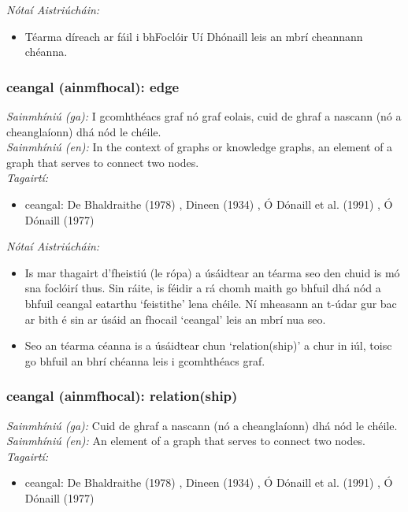  \noindent \textit{Nótaí Aistriúcháin:}
\begin{itemize}
	\item Téarma díreach ar fáil i bhFoclóir Uí Dhónaill leis an mbrí cheannann chéanna.
\end{itemize}


\subsubsection*{ceangal (ainmfhocal): edge}
 \noindent \textit{Sainmhíniú (ga):} I gcomhthéacs graf nó graf eolais, cuid de ghraf a nascann (nó a cheanglaíonn) dhá nód le chéile.
\\
 \noindent \textit{Sainmhíniú (en):} In the context of graphs or knowledge graphs, an element of a graph that serves to connect two nodes.
\\
 \noindent \textit{Tagairtí:}
\begin{itemize}
	\item ceangal: De Bhaldraithe (1978) \cite{de-bhaldraithe}, Dineen (1934) \cite{dineen}, Ó Dónaill et al. (1991) \cite{focloir-beag}, Ó Dónaill (1977) \cite{odonaill}
\end{itemize}

 \noindent \textit{Nótaí Aistriúcháin:}
\begin{itemize}
	\item Is mar thagairt d'fheistiú (le rópa) a úsáidtear an téarma seo den chuid is mó sna foclóirí thus. Sin ráite, is féidir a rá chomh maith go bhfuil dhá nód a bhfuil ceangal eatarthu `feistithe' lena chéile. Ní mheasann an t-údar gur bac ar bith é sin ar úsáid an fhocail `ceangal' leis an mbrí nua seo.
	\item Seo an téarma céanna is a úsáidtear chun `relation(ship)' a chur in iúl, toisc go bhfuil an bhrí chéanna leis i gcomhthéacs graf.
\end{itemize}


\subsubsection*{ceangal (ainmfhocal): relation(ship)}
 \noindent \textit{Sainmhíniú (ga):} Cuid de ghraf a nascann (nó a cheanglaíonn) dhá nód le chéile.
\\
 \noindent \textit{Sainmhíniú (en):} An element of a graph that serves to connect two nodes.
\\
 \noindent \textit{Tagairtí:}
\begin{itemize}
	\item ceangal: De Bhaldraithe (1978) \cite{de-bhaldraithe}, Dineen (1934) \cite{dineen}, Ó Dónaill et al. (1991) \cite{focloir-beag}, Ó Dónaill (1977) \cite{odonaill}
\end{itemize}


